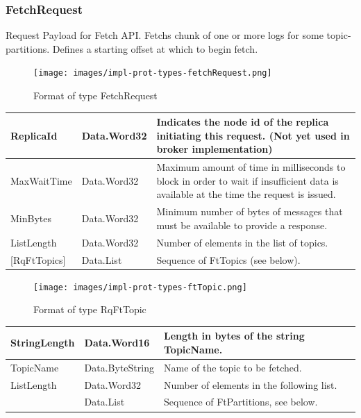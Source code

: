 \subsubsection{FetchRequest}
\label{subsubsec:protocol-fetchrequest}

Request Payload for Fetch API. Fetchs chunk of one or more logs for some
topic-partitions. Defines a starting offset at which to begin fetch. 

\begin{figure}[H]
    \centering
    \texttt{[image: images/impl-prot-types-fetchRequest.png]}
    \caption{Format of type FetchRequest}
    \label{fig:impl-prot-types-fetchRequest}
\end{figure}

\begin{table}[H]
\centering
\begin{tabular}{ l  l  p{8cm} }
\hline
ReplicaId      & Data.Word32 & Indicates the node id of the replica initiating this request. (Not yet used in broker implementation)                        \\ \hline
MaxWaitTime    & Data.Word32 & Maximum amount of time in milliseconds to block
in order to wait if insufficient data is available at the time the request is issued. \\ \hline
MinBytes       & Data.Word32 & Minimum number of bytes of messages that must be
available to provide a response.                                               \\ \hline
ListLength     & Data.Word32 & Number of elements in the list of
topics.                                                                                        \\ \hline
{[}RqFtTopics{]} & Data.List   & Sequence of FtTopics (see below).                                                                                              \\ \hline
\end{tabular}
\end{table}

\begin{figure}[H]
    \centering
    \texttt{[image: images/impl-prot-types-ftTopic.png]}
    \caption{Format of type RqFtTopic}
    \label{fig:impl-prot-types-ftTopic}
\end{figure}

\begin{table}[H]
\centering
\begin{tabular}{ l  l  p{8cm} }
\hline
StringLength      & Data.Word16     & Length in bytes of the string TopicName.              \\ \hline
TopicName         & Data.ByteString & Name of the topic to be fetched. \\ \hline
ListLength        & Data.Word32     & Number of elements in the following list.                \\ \hline
[RqFtPartition]     & Data.List       & Sequence of FtPartitions, see below.                \\ \hline
\end{tabular}
\end{table}

